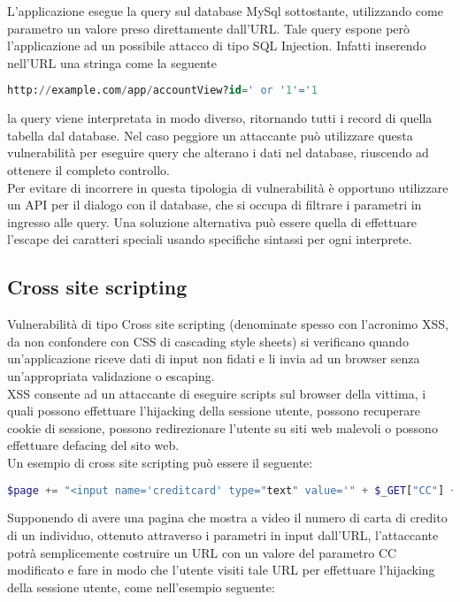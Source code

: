 L'applicazione esegue la query sul database MySql sottostante, utilizzando come parametro un valore preso direttamente dall'URL. Tale query espone però l'applicazione ad un possibile attacco di tipo SQL Injection. Infatti inserendo nell'URL una stringa come la seguente

\begin{lstlisting}[language=SQL]
http://example.com/app/accountView?id=' or '1'='1
\end{lstlisting}

la query viene interpretata in modo diverso, ritornando tutti i record di quella tabella dal database. Nel caso peggiore un attaccante può utilizzare questa vulnerabilità per eseguire query che alterano i dati nel database, riuscendo ad ottenere il completo controllo. \\
Per evitare di incorrere in questa tipologia di vulnerabilità è opportuno utilizzare un API per il dialogo con il database, che si occupa di filtrare i parametri in ingresso alle query. Una soluzione alternativa può essere quella di effettuare l'escape dei caratteri speciali usando specifiche sintassi per ogni interprete.

\subsection{Cross site scripting}
Vulnerabilità di tipo Cross site scripting (denominate spesso con l'acronimo XSS, da non confondere con CSS di cascading style sheets) si verificano quando un'applicazione riceve dati di input non fidati e li invia ad un browser senza un'appropriata validazione o escaping. \\
XSS consente ad un attaccante di eseguire scripts sul browser della vittima, i quali possono effettuare l'hijacking della sessione utente, possono recuperare cookie di sessione, possono redirezionare l'utente su siti web malevoli o possono effettuare defacing del sito web. \\
Un esempio di cross site scripting può essere il seguente: 

\begin{lstlisting}[language=PHP]
$page += "<input name='creditcard' type="text" value='" + $_GET["CC"] + "'>";
\end{lstlisting}

Supponendo di avere una pagina che mostra a video il numero di carta di credito di un individuo, ottenuto attraverso i parametri in input dall'URL, l'attaccante potrà semplicemente costruire un URL con un valore del parametro CC modificato e fare in modo che l'utente visiti tale URL per effettuare l'hijacking della sessione utente, come nell'esempio seguente:

